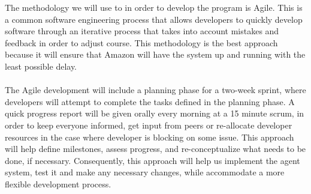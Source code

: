 \documentclass[12pt,a4paper]{article}
\begin{document}
		The methodology we will use to in order to develop the program is Agile. This is a common software engineering process that allows developers to quickly develop software through an iterative process that takes into account mistakes and feedback in order to adjust course. This methodology is the best approach because it will ensure that Amazon will have the system up and running with the least possible delay. 
		\\\\
		The Agile development will include a planning phase for a two-week sprint, where developers will attempt to complete the tasks defined in the planning phase. A quick progress report will be given orally every morning at a 15 minute scrum, in order to keep everyone informed, get input from peers or re-allocate developer resources in the case where developer is blocking on some issue. This approach will help define milestones, assess progress, and re-conceptualize what needs to be done, if necessary. Consequently, this approach will help us implement the agent system, test it and make any necessary changes, while accommodate a more flexible development process. 
		
\end{document}
